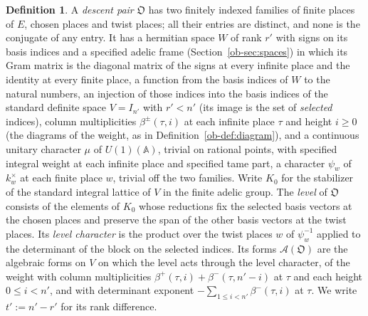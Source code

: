 \documentclass[reqno]{amsart}
\theoremstyle{definition}
\newtheorem{definition}{Definition}[section]
\theoremstyle{plain}
\newcommand{\DP}{\mathfrak{O}}
\begin{document}
\begin{definition}\label{def:descent-pair}
A \emph{descent pair} \(\DP\) has two finitely indexed families of finite places of \(E\), chosen places and twist places; all their entries are distinct, and none is the conjugate of any entry.  It has a hermitian space \(W\) of rank \(r'\) with signs on its basis indices and a specified adelic frame (Section~\ref{ob-sec:spaces}) in which its Gram matrix is the diagonal matrix of the signs at every infinite place and the identity at every finite place, a function from the basis indices of \(W\) to the natural numbers, an injection of those indices into the basis indices of the standard definite space \(V = I_{n'}\) with \(r' < n'\) (its image is the set of \emph{selected} indices), column multiplicities \(\beta^\pm(\tau,i)\) at each infinite place \(\tau\) and height \(i \ge 0\) (the diagrams of the weight, as in Definition~\ref{ob-def:diagram}), and a continuous unitary character \(\mu\) of \(U(1)(\mathbb A)\), trivial on rational points, with specified integral weight at each infinite place and specified tame part, a character \(\psi_w\) of \(k_w^\times\) at each finite place \(w\), trivial off the two families.  Write \(K_0\) for the stabilizer of the standard integral lattice of \(V\) in the finite adelic group.  The \emph{level} of \(\DP\) consists of the elements of \(K_0\) whose reductions fix the selected basis vectors at the chosen places and preserve the span of the other basis vectors at the twist places.  Its \emph{level character} is the product over the twist places \(w\) of \(\psi_w^{-1}\) applied to the determinant of the block on the selected indices.  Its forms \(\mathcal A(\DP)\) are the algebraic forms on \(V\) on which the level acts through the level character, of the weight with column multiplicities \(\beta^+(\tau,i)+\beta^-(\tau,n'-i)\) at \(\tau\) and each height \(0\le i<n'\), and with determinant exponent \(-\sum_{1\le i<n'} \beta^-(\tau,i)\) at \(\tau\).  We write \(t' := n' - r'\) for its rank difference.
\end{definition}
\end{document}
